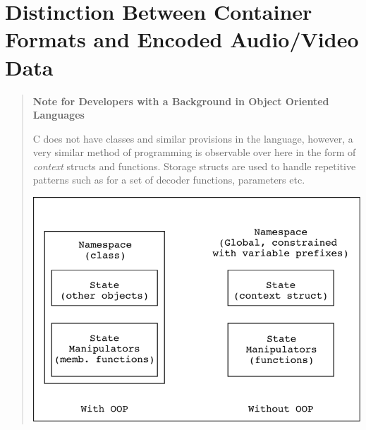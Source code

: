 \documentclass{article}
\begin{document}
\section{Distinction Between Container Formats and Encoded Audio/Video Data}
\begin{quote}
\textbf{ Note for Developers with a Background in Object Oriented Languages}

C does not have classes and similar provisions in the language, however, a very 
similar method of programming is observable over here in the form of 
\emph{context} structs and functions. Storage structs are used to handle 
repetitive patterns such as for a set of decoder functions, parameters etc.

\includegraphics{images/classes_and_c.svg}
\end{quote}
\end{document}
